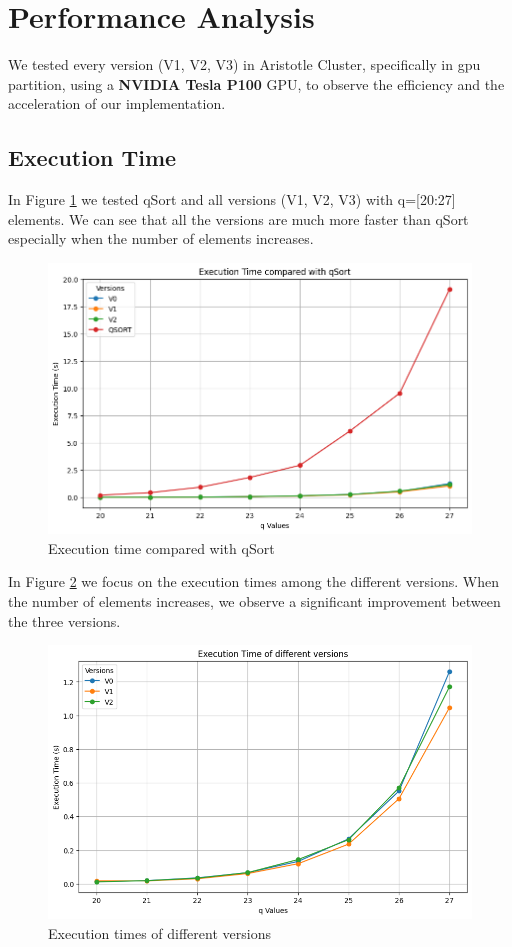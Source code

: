 \documentclass[a4paper,12pt]{article}
\begin{document}
\section{Performance Analysis}
We tested every version (V1, V2, V3) in Aristotle Cluster, specifically in gpu partition, using a \textbf{NVIDIA Tesla P100} GPU, to observe the efficiency and the acceleration of our implementation.

\subsection{Execution Time}
In Figure \ref{fig:qSort} we tested qSort and all versions (V1, V2, V3) with q=[20:27] elements. We can see that all the versions are much more faster than qSort especially when the number of elements increases.

\begin{figure}[H]
    \centering
    \includegraphics[width=1\linewidth]{assets/execution_time_qsort.png}
    \caption{Execution time compared with qSort}
    \label{fig:qSort}
\end{figure}

In Figure \ref{fig:versions} we focus on the execution times among the different versions. When the number of elements increases, we observe a significant improvement between the three versions.

\begin{figure}
    \centering
    \includegraphics[width=1\linewidth]{assets/execution_time_versions.png}
    \caption{Execution times of different versions}
    \label{fig:versions}
\end{figure}
\end{document}
